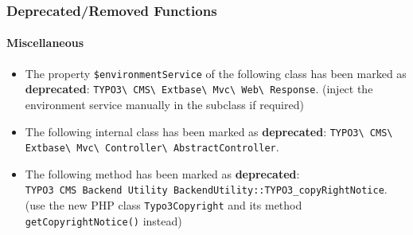 \begin{frame}[fragile]
	\frametitle{Deprecated/Removed Functions}
	\framesubtitle{Miscellaneous}

	\lstset{basicstyle=\tiny\ttfamily}

	\begin{itemize}

		\item The property \texttt{\$environmentService} of the following class has been marked as \textbf{deprecated}:
			\texttt{TYPO3\textbackslash
				CMS\textbackslash
				Extbase\textbackslash
				Mvc\textbackslash
				Web\textbackslash
				Response}.\newline
			\smaller
				(inject the environment service manually in the subclass if required)
			\normalsize

		\item The following internal class has been marked as \textbf{deprecated}:\newline
			\texttt{TYPO3\textbackslash
				CMS\textbackslash
				Extbase\textbackslash
				Mvc\textbackslash
				Controller\textbackslash
				AbstractController}.

		\item The following method has been marked as \textbf{deprecated}:\newline
			\texttt{TYPO3\
				CMS\
				Backend\
				Utility\
				BackendUtility::TYPO3\_copyRightNotice}.\newline
				\smaller
					(use the new PHP class \texttt{Typo3Copyright} and its method \texttt{getCopyrightNotice()} instead)
				\normalsize

	\end{itemize}

\end{frame}


